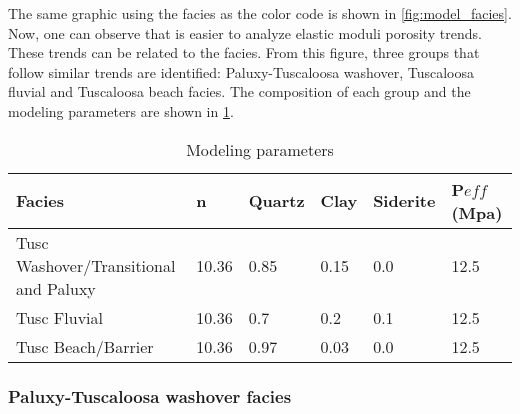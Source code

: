 

The same graphic using the facies
as the color code  is shown in \ref{fig:model_facies}. Now, one can observe that is easier to analyze elastic
moduli porosity trends. These trends can be related to the facies. From this figure, 
three groups that follow similar trends are identified: Paluxy-Tuscaloosa washover, 
Tuscaloosa fluvial and Tuscaloosa beach facies. The composition of each group
and the modeling parameters are shown in \ref{tab:modeling}.




\begin{table}
\caption{ Modeling parameters \label{tab:modeling}}
\begin{center}
\begin{tabular}{ | l | l | l|  l | l | l|}
\hline
  Facies                               &  n    & Quartz & Clay  & Siderite & P$eff$ (Mpa)  \\
\hline
Tusc Washover/Transitional and Paluxy  & 10.36 &   0.85 &  0.15 &     0.0  &  12.5  \\
\hline
Tusc Fluvial                           & 10.36 &   0.7  &  0.2  &     0.1  &  12.5  \\
\hline
Tusc Beach/Barrier                     & 10.36 &   0.97  &  0.03 &     0.0  &  12.5  \\
\hline
\end{tabular}
\end{center}
\end{table}

\subsubsection{Paluxy-Tuscaloosa washover facies}

